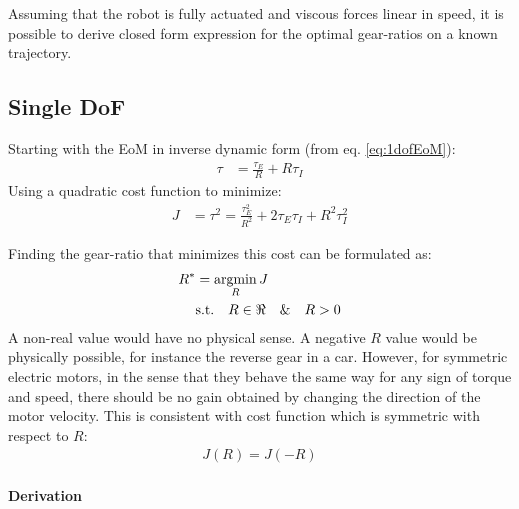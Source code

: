 Assuming that the robot is fully actuated and viscous forces linear in speed, it is possible to derive closed form expression for the optimal gear-ratios on a known trajectory.


\subsection{Single DoF}
\label{sec:optgearproof1}

Starting with the EoM in inverse dynamic form (from eq. \eqref{eq:1dofEoM}):
%
\begin{align}
\tau  &=  \frac{\tau_E}{R} + R \tau_I
\end{align}
%
Using a quadratic cost function to minimize:
%
\begin{align}
J &=  \tau^2 = \frac{\tau_E^2}{R^2} + 2 \tau_E \tau_I + R^2 \tau_I^2
\label{eq:Jonedof}
\end{align}
%

Finding the gear-ratio that minimizes this cost can be formulated as:
%
\begin{align}
R^* &=  \operatornamewithlimits{argmin}\limits_{R} J \\
   &   \text{s.t.} \quad R \in \Re  \quad \& \quad R > 0
\end{align}
%
A non-real value would have no physical sense. A negative $R$ value would be physically possible, for instance the reverse gear in a car. However, for symmetric electric motors, in the sense that they behave the same way for any sign of torque and speed, there should be no gain obtained by changing the direction of the motor velocity. This is consistent with cost function which is symmetric with respect to $R$:
%
\begin{align}
J(R) = J( -R )
\end{align}
%

\paragraph{Derivation}

